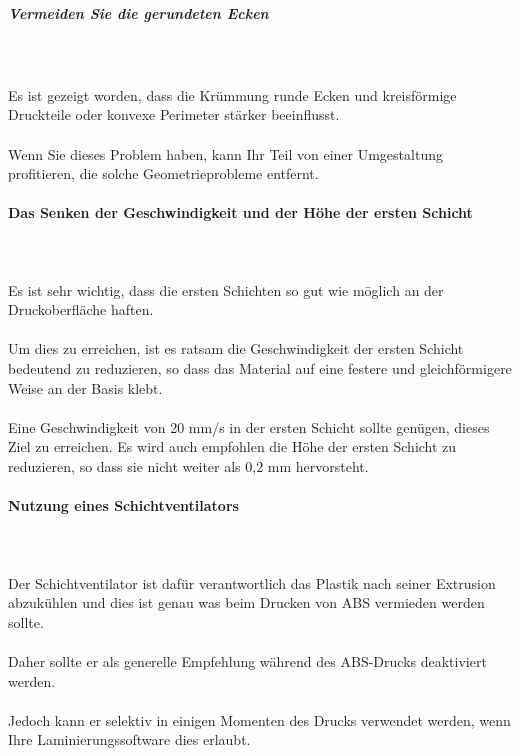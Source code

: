 \documentclass[11pt,a4paper]{article}
\begin{document}
				\subparagraph{Vermeiden Sie die gerundeten Ecken}\mbox{}\\\\
Es ist gezeigt worden, dass die Krümmung runde Ecken und kreisförmige Druckteile oder konvexe Perimeter stärker beeinflusst.
\\\\
Wenn Sie dieses Problem haben, kann Ihr Teil von einer Umgestaltung profitieren, die solche Geometrieprobleme entfernt.
			\paragraph{Das Senken der Geschwindigkeit und der Höhe der ersten Schicht}\mbox{}\\\\
Es ist sehr wichtig, dass die ersten Schichten so gut wie möglich an der Druckoberfläche haften. 
\\\\
Um dies zu erreichen, ist es ratsam die Geschwindigkeit der ersten Schicht bedeutend zu reduzieren, so dass das Material auf eine festere und gleichförmigere Weise an der Basis klebt.
\\\\
Eine Geschwindigkeit von 20 mm/s in der ersten Schicht sollte genügen, dieses Ziel zu erreichen. Es wird auch empfohlen die Höhe der ersten Schicht zu reduzieren, so dass sie nicht weiter als 0,2 mm hervorsteht.
			\paragraph{Nutzung eines Schichtventilators}\mbox{}\\\\
Der Schichtventilator ist dafür verantwortlich das Plastik nach seiner Extrusion abzukühlen und dies ist genau was beim Drucken von ABS vermieden werden sollte.
\\\\
Daher sollte er als generelle Empfehlung während des ABS-Drucks deaktiviert werden.
\\\\
Jedoch kann er selektiv in einigen Momenten des Drucks verwendet werden, wenn Ihre Laminierungssoftware dies erlaubt.
\end{document}
